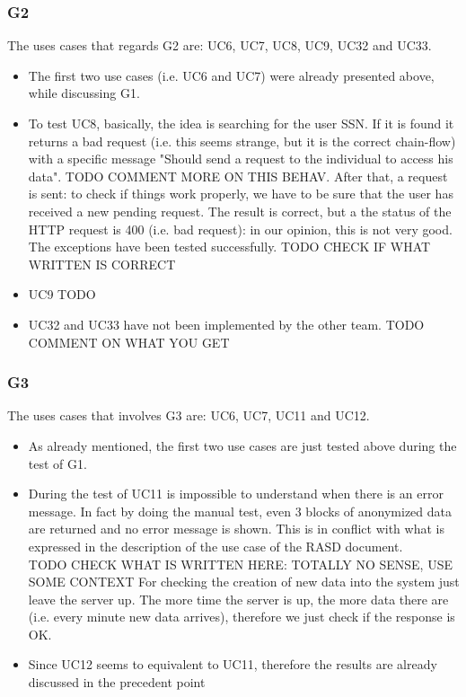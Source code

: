 

\subsubsection{G2}
The uses cases that regards G2 are: UC6, UC7, UC8, UC9, UC32 and UC33.  \\


\begin{itemize}
\item The first two use cases (i.e. UC6 and UC7) were already presented above, while discussing G1.

\item To test UC8, basically, the idea is searching for the user SSN. 
If it is found it returns a bad request (i.e. this seems strange, but it is the correct chain-flow) with a specific message "Should send a
request to the individual to access his data". TODO COMMENT MORE ON THIS BEHAV.
After that, a request is sent: to check if things work properly, we have to be sure that the user has received a new pending request. 
The result is correct, but a the status of the HTTP request is 400 (i.e. bad request): in our opinion, this is not very good.  \\
The exceptions have been tested successfully. 
TODO CHECK IF WHAT WRITTEN IS CORRECT

\item UC9 TODO

\item UC32 and UC33 have not been implemented by the other team. TODO COMMENT ON WHAT YOU GET

\end{itemize}

\subsubsection{G3}
The uses cases that involves G3 are: UC6, UC7, UC11 and UC12.  \\

\begin{itemize}
\item 
As already mentioned, the first two use cases are just tested above during the test of G1.

\item 
During the test of UC11 is impossible to understand when there is an error message. 
In fact by doing the manual test, even 3 blocks of anonymized data are returned and no error message is shown. 
This is in conflict with what is expressed in the description of the use case of the RASD document. \\

TODO CHECK WHAT IS WRITTEN HERE: TOTALLY NO SENSE, USE SOME CONTEXT
For checking the creation of new data into the system just leave the server up. 
The more time the server is up, the more
data there are (i.e. every minute new data arrives), therefore we just check if the response is OK.

\item Since UC12 seems to equivalent to UC11, therefore the results are already discussed in the precedent point

\end{itemize}

